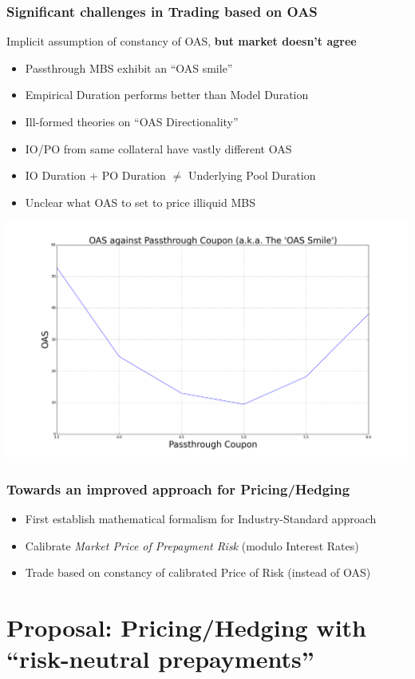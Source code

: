 \documentclass{beamer}
\begin{document}
\begin{frame}
\frametitle{Significant challenges in Trading based on OAS}
Implicit assumption of constancy of OAS, {\bf but market doesn't agree}
\begin{itemize}
\item Passthrough MBS exhibit an ``OAS smile''
\item Empirical Duration performs better than Model Duration
\item Ill-formed theories on ``OAS Directionality''
\item IO/PO from same collateral have vastly different OAS
\item IO Duration + PO Duration $\neq$ Underlying Pool Duration
\item Unclear what OAS to set to price illiquid MBS
\end{itemize}
\end{frame}

\begin{frame}
\includegraphics[scale=0.25]{oas_smile.png}
\end{frame}

\begin{frame}
\frametitle{Towards an improved approach for Pricing/Hedging}
\begin{itemize}
 \item First establish mathematical formalism for Industry-Standard approach
 \item Calibrate {\em Market Price of Prepayment Risk} (modulo Interest Rates)
 \item Trade based on constancy of calibrated Price of Risk (instead of OAS)
 \end{itemize}
\end{frame}


\section{Proposal: Pricing/Hedging with  ``risk-neutral prepayments''}
\end{document}
